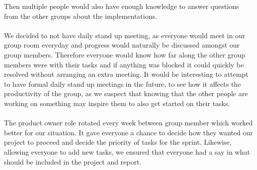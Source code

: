 Then multiple people would also have enough knowledge to answer questions from the other groups about the implementations.
\\\\
We decided to not have daily stand up meeting, as everyone would meet in our group room everyday and progress would naturally be discussed amongst our group members.
Therefore everyone would know how far along the other group members were with their tasks and if anything was blocked it could quickly be resolved without arranging an extra meeting.
It would be interesting to attempt to have formal daily stand up meetings in the future, to see how it affects the productivity of the group, as we suspect that knowing that the other people are working on something may inspire them to also get started on their tasks.
\\\\
The product owner role rotated every week between group member which worked better for our situation. 
It gave everyone a chance to decide how they wanted our project to proceed and decide the priority of tasks for the sprint.
Likewise, allowing everyone to add new tasks, we ensured that everyone had a say in what should be included in the project and report.
